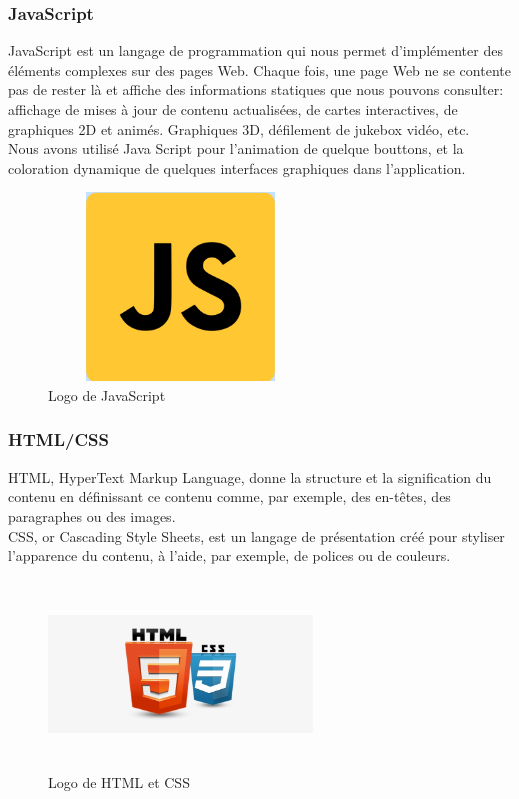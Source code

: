 \subsubsection*{JavaScript}
JavaScript est un langage de  programmation qui nous permet d'implémenter des éléments complexes sur des pages Web. Chaque fois, une page Web ne se contente pas de rester là et affiche des informations statiques que nous pouvons consulter: affichage de mises à jour de contenu actualisées, de cartes interactives, de graphiques 2D et animés. Graphiques 3D, défilement de jukebox vidéo, etc.\\
Nous avons utilisé Java Script pour l'animation de quelque bouttons, et la coloration dynamique de quelques interfaces graphiques dans l'application.
\begin{figure}[h]
      \centering
        \includegraphics[width=7cm,height=5cm]{img/javascript.png}
        \caption{Logo de JavaScript}
\end{figure}

\subsubsection*{HTML/CSS}
HTML, HyperText Markup Language, donne la structure et la signification du contenu en définissant ce contenu comme, par exemple, des en-têtes, des paragraphes ou des images.\\
CSS, or Cascading Style Sheets, est un langage de présentation créé pour styliser l'apparence du contenu, à l'aide, par exemple, de polices ou de couleurs.\\
\begin{figure}[h]
      \centering
        \includegraphics[width=7cm,height=5cm]{img/HTMLCSS.png}
        \caption{Logo de HTML et CSS}
\end{figure}

